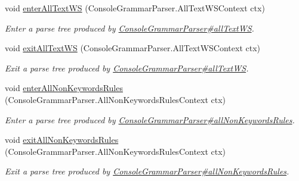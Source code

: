 \begin{DoxyCompactItemize}
void \hyperlink{interfacegov_1_1nasa_1_1jpf_1_1inspector_1_1client_1_1parser_1_1_console_grammar_listener_a9ad0466fe08124d8fcc71f370fa69fdb}{enter\+All\+Text\+WS} (Console\+Grammar\+Parser.\+All\+Text\+W\+S\+Context ctx)
\begin{DoxyCompactList}\small\item\em Enter a parse tree produced by \hyperlink{classgov_1_1nasa_1_1jpf_1_1inspector_1_1client_1_1parser_1_1_console_grammar_parser_adc161fc81eedd939154fd25e889f5b28}{Console\+Grammar\+Parser\#all\+Text\+WS}. \end{DoxyCompactList}\item 
void \hyperlink{interfacegov_1_1nasa_1_1jpf_1_1inspector_1_1client_1_1parser_1_1_console_grammar_listener_a6dc85ee6a04ed61b98168c10bba75618}{exit\+All\+Text\+WS} (Console\+Grammar\+Parser.\+All\+Text\+W\+S\+Context ctx)
\begin{DoxyCompactList}\small\item\em Exit a parse tree produced by \hyperlink{classgov_1_1nasa_1_1jpf_1_1inspector_1_1client_1_1parser_1_1_console_grammar_parser_adc161fc81eedd939154fd25e889f5b28}{Console\+Grammar\+Parser\#all\+Text\+WS}. \end{DoxyCompactList}\item 
void \hyperlink{interfacegov_1_1nasa_1_1jpf_1_1inspector_1_1client_1_1parser_1_1_console_grammar_listener_a443f8c0532f6c57c78d263c903fe7469}{enter\+All\+Non\+Keywords\+Rules} (Console\+Grammar\+Parser.\+All\+Non\+Keywords\+Rules\+Context ctx)
\begin{DoxyCompactList}\small\item\em Enter a parse tree produced by \hyperlink{classgov_1_1nasa_1_1jpf_1_1inspector_1_1client_1_1parser_1_1_console_grammar_parser_a2849ff1ee2341a3450b6fbdbe326336d}{Console\+Grammar\+Parser\#all\+Non\+Keywords\+Rules}. \end{DoxyCompactList}\item 
void \hyperlink{interfacegov_1_1nasa_1_1jpf_1_1inspector_1_1client_1_1parser_1_1_console_grammar_listener_a84f0e6b99970d48137a8a6976088392e}{exit\+All\+Non\+Keywords\+Rules} (Console\+Grammar\+Parser.\+All\+Non\+Keywords\+Rules\+Context ctx)
\begin{DoxyCompactList}\small\item\em Exit a parse tree produced by \hyperlink{classgov_1_1nasa_1_1jpf_1_1inspector_1_1client_1_1parser_1_1_console_grammar_parser_a2849ff1ee2341a3450b6fbdbe326336d}{Console\+Grammar\+Parser\#all\+Non\+Keywords\+Rules}. \end{DoxyCompactList}\item 

\end{DoxyCompactItemize}
